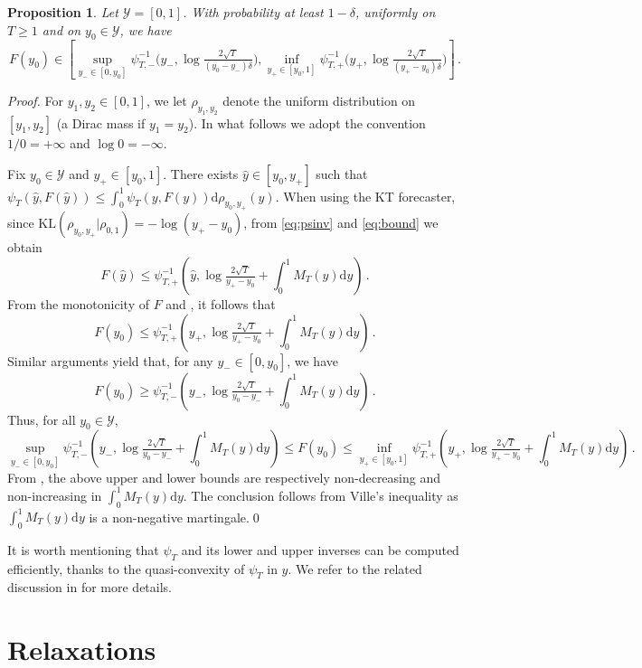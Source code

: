\documentclass[3p, authoryear, 10pt]{elsarticle}%
\newtheorem{proposition}{Proposition}
\newcommand{\dd}{\mathrm d}
\newcommand{\KL}{\mathrm{KL}}
\newcommand{\Y}{\mathcal Y}
\begin{document}
\begin{proposition}\label{pro:psi_cs}
    Let $\Y=[0,1]$. With probability at least $1-\delta$, uniformly on $T\geq1$ and on $y_0\in\Y$, we have 
    $$F(y_0)\in\left[\sup_{y_-\in[0,y_0]}\psi_{T,-}^{-1}\Big(y_-, \log\tfrac{2\sqrt T}{(y_0-y_-)\delta}\Big),\inf_{y_+\in[y_0,1]}\psi_{T,+}^{-1}\Big(y_+,\log\tfrac{2\sqrt T}{(y_+-y_0)\delta}\Big)\right]\,.$$
\end{proposition}
\begin{proof}   
    For $y_1,y_2\in [0,1]$, we let $\rho_{y_1,y_2}$ denote the uniform distribution on $[y_1,y_2]$ (a Dirac mass if $y_1=y_2$). In what follows we adopt the convention $1/0=+\infty$ and $\log0=-\infty$.
    
    Fix $y_0\in\Y$ and $y_+\in[y_0,1]$. There exists $\hat y\in[y_0,y_+]$ such that $\psi_T(\hat y, F(\hat y))\leq\int_{0}^{1}\psi_T(y, F(y))\dd\rho_{y_0,y_+}(y)$. When using the KT forecaster, since $\KL(\rho_{y_0,y_+}|\rho_{0,1}) = -\log(y_+-y_0)$, from \eqref{eq:psinv} and \eqref{eq:bound} we obtain
    $$F(\hat y) \leq \psi_{T,+}^{-1}\left(\hat y, \log\tfrac{2\sqrt T}{y_+-y_0} + \textstyle\int_0^1M_T(y)\dd y\right)\,.$$
    From the monotonicity of $F$ and , it follows that
    $$F(y_0) \leq \psi_{T,+}^{-1}\left(y_+, \log\tfrac{2\sqrt T}{y_+-y_0} + \textstyle\int_0^1M_T(y)\dd y\right)\,.$$
    Similar arguments yield that, for any $y_-\in[0,y_0]$, we have
    $$F(y_0) \geq \psi_{T,-}^{-1}\left(y_-, \log\tfrac{2\sqrt T}{y_0-y_-} + \textstyle\int_0^1M_T(y)\dd y\right)\,.$$
    Thus, for all $y_0\in\Y$,
    $$\sup_{y_-\in[0,y_0]}\psi_{T,-}^{-1}\left(y_-, \log\tfrac{2\sqrt T}{y_0-y_-} + \textstyle\int_0^1M_T(y)\dd y\right)\leq F(y_0)\leq \inf_{y_+\in[y_0,1]}\psi_{T,+}^{-1}\left(y_+, \log\tfrac{2\sqrt T}{y_+-y_0} + \textstyle\int_0^1M_T(y)\dd y\right)\,.$$
    From , the above upper and lower bounds are respectively non-decreasing and non-increasing in $\int_0^1M_T(y)\dd y$. The conclusion follows from Ville's inequality as $\int_0^1M_T(y)\dd y$ is a non-negative martingale.\qed
\end{proof}
It is worth mentioning that $\psi_T$ and its lower and upper inverses can be computed efficiently, thanks to the quasi-convexity of $\psi_T$ in $y$. We refer to the related discussion in \cite{orabona2023tight} for more details.

\section{Relaxations}
\end{document}
